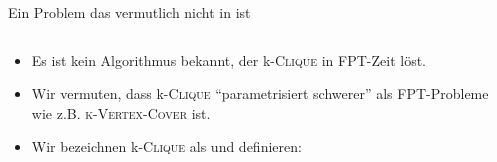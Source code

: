 \documentclass[navbaroff]{sdqbeamer}
\begin{document}
\begin{frame}[t]{Ein Problem das vermutlich nicht in \FPT ist}
    \vspace{-10pt}
    \begin{overlayarea}{1\textwidth}{1\textheight}
        \begin{columns}
            \begin{column}{0.65\textwidth}
                \begin{itemize}
                    \item<3-> Es ist kein Algorithmus bekannt, der k-\textsc{Clique}
                    in FPT-Zeit löst.
                    \item<4-> Wir vermuten, dass k-\textsc{Clique} \enquote{parametrisiert schwerer} als FPT-Probleme wie z.B. \textsc{k-Vertex-Cover} ist.
                    \item<5-> Wir bezeichnen k-\textsc{Clique} als  und definieren:
                \end{itemize}
                \vspace{-5pt}
            \end{column}
            \begin{column}{0.3\textwidth}
            \end{column}
        \end{columns}
    \end{overlayarea}
\end{frame}
\end{document}
